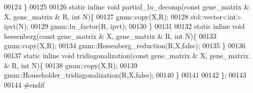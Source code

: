 \begin{DoxyCode}
00124   \}
00125 
00126   \textcolor{keyword}{static} \textcolor{keyword}{inline} \textcolor{keywordtype}{void} partial\_lu\_decomp(\textcolor{keyword}{const} gene\_matrix & X, gene\_matrix & R, \textcolor{keywordtype}{int} N)\{
00127     gmm::copy(X,R);
00128     std::vector<int> ipvt(N);
00129     gmm::lu\_factor(R, ipvt);
00130   \}
00131 
00132   \textcolor{keyword}{static} \textcolor{keyword}{inline} \textcolor{keywordtype}{void} hessenberg(\textcolor{keyword}{const} gene\_matrix & X, gene\_matrix & R, \textcolor{keywordtype}{int} N)\{
00133     gmm::copy(X,R);
00134     gmm::Hessenberg\_reduction(R,X,\textcolor{keyword}{false});
00135   \}
00136 
00137   \textcolor{keyword}{static} \textcolor{keyword}{inline} \textcolor{keywordtype}{void} tridiagonalization(\textcolor{keyword}{const} gene\_matrix & X, gene\_matrix & R, \textcolor{keywordtype}{int} N)\{
00138     gmm::copy(X,R);
00139     gmm::Householder\_tridiagonalization(R,X,\textcolor{keyword}{false});
00140   \}
00141 
00142 \};
00143 
00144 \textcolor{preprocessor}{#endif}
\end{DoxyCode}
